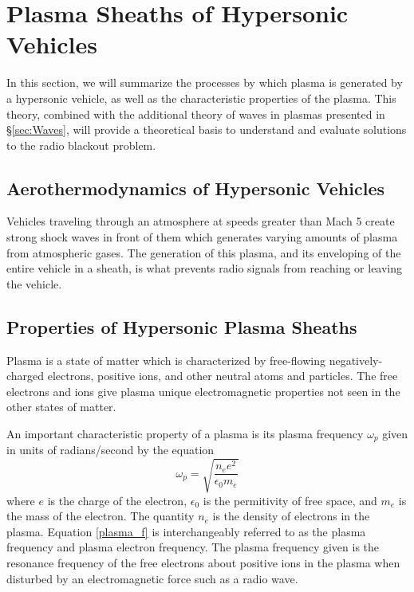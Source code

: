 \documentclass[twocolumn]{article}
\begin{document}
\section{Plasma Sheaths of Hypersonic Vehicles} \label{sec:PlasmaSheaths}
In this section, we will summarize the processes by which plasma is generated by a hypersonic vehicle, as well as the characteristic properties of the plasma.
This theory, combined with the additional theory of waves in plasmas presented in \S\ref{sec:Waves}, will provide a theoretical basis to understand and evaluate solutions to the radio blackout problem.

\subsection*{Aerothermodynamics of Hypersonic Vehicles}
Vehicles traveling through an atmosphere at speeds greater than Mach 5 create strong shock waves in front of them which generates varying amounts of plasma from atmospheric gases.
The generation of this plasma, and its enveloping of the entire vehicle in a sheath, is what prevents radio signals from reaching or leaving the vehicle.

\begin{figure}[H]
	\centering
\end{figure}
\subsection*{Properties of Hypersonic Plasma Sheaths}
Plasma is a state of matter which is characterized by free-flowing negatively-charged electrons, positive ions, and other neutral atoms and particles.
The free electrons and ions give plasma unique electromagnetic properties not seen in the other states of matter.

An important characteristic property of a plasma is its plasma frequency $\omega_p$ given in units of radians/second by the equation
\begin{equation} \label{plasma_f}
\omega_p = \sqrt{\frac{n_e e^2}{\epsilon_0 m_e}}
\end{equation}
where $e$ is the charge of the electron, $\epsilon_0$ is the permitivity of free space, and $m_e$ is the mass of the electron. 
The quantity $n_e$ is the density of electrons in the plasma.\cite{chen_introduction_1984,kim_analysis_2008}
Equation \ref{plasma_f} is interchangeably referred to as the plasma frequency and plasma electron frequency. The plasma frequency given is the resonance frequency of the free electrons about positive ions in the plasma when disturbed by an electromagnetic force such as a radio wave.\cite{chen_introduction_1984}
\end{document}
